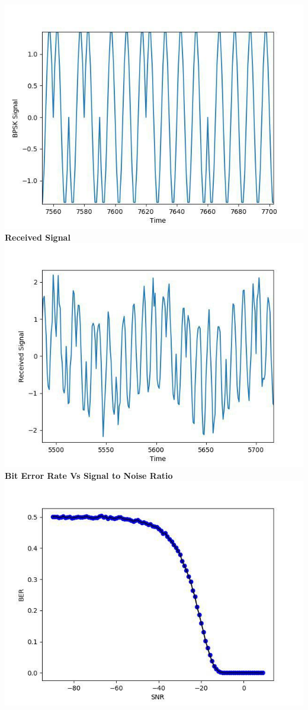 \documentclass[a4paper,10pt]{article}
\begin{document}
\begin{center}
\includegraphics[width=15cm, height=10cm]{fig4}\\
\vspace*{1cm}
\newpage
\large{\textbf{Received Signal}}\\
\includegraphics[width=15cm, height=10cm]{fig5}\\
\vspace*{1cm}
\large{\textbf{Bit Error Rate Vs Signal to Noise Ratio}}\\
\includegraphics[width=15cm, height=10cm]{fig6}\\

\end{center}
\end{document}

